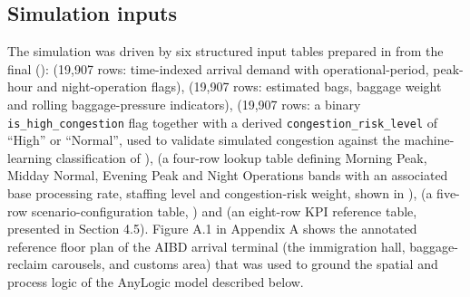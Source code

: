 \subsection{Simulation inputs}
\label{subsec:simulation-inputs}

The simulation was driven by six structured input tables prepared in  from the final  ():  (19,907 rows: time-indexed arrival demand with operational-period, peak-hour and night-operation flags),  (19,907 rows: estimated bags, baggage weight and rolling baggage-pressure indicators),  (19,907 rows: a binary \nolinkurl{is_high_congestion} flag together with a derived \nolinkurl{congestion_risk_level} of ``High'' or ``Normal'', used to validate simulated congestion against the machine-learning classification of ),  (a four-row lookup table defining Morning Peak, Midday Normal, Evening Peak and Night Operations bands with an associated base processing rate, staffing level and congestion-risk weight, shown in ),  (a five-row scenario-configuration table, ) and  (an eight-row KPI reference table, presented in Section 4.5). Figure A.1 in Appendix A shows the annotated reference floor plan of the AIBD arrival terminal (the immigration hall, baggage-reclaim carousels, and customs area) that was used to ground the spatial and process logic of the AnyLogic model described below.

